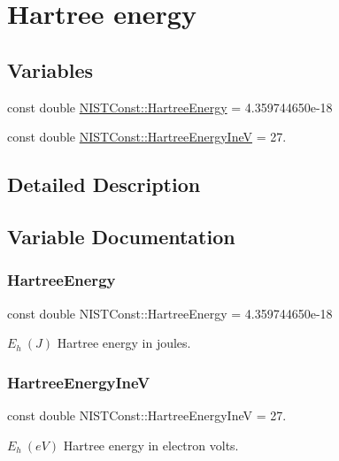 \hypertarget{group___n_i_s_t_const-_hartree_energy}{}\section{Hartree energy}
\label{group___n_i_s_t_const-_hartree_energy}
\subsection*{Variables}
\begin{DoxyCompactItemize}
\item 
const double \mbox{\hyperlink{group___n_i_s_t_const-_hartree_energy_gab58dc1c4e59e83d4fb1217778fe9f29b}{N\+I\+S\+T\+Const\+::\+Hartree\+Energy}} = 4.\+359744650e-\/18
\item 
const double \mbox{\hyperlink{group___n_i_s_t_const-_hartree_energy_ga400eb5b8c9b55b0f601870ba54120364}{N\+I\+S\+T\+Const\+::\+Hartree\+Energy\+IneV}} = 27.
\end{DoxyCompactItemize}


\subsection{Detailed Description}


\subsection{Variable Documentation}
\mbox{\label{group___n_i_s_t_const-_hartree_energy_gab58dc1c4e59e83d4fb1217778fe9f29b}} 
\subsubsection{\texorpdfstring{Hartree\+Energy}{HartreeEnergy}}
{\footnotesize\ttfamily const double N\+I\+S\+T\+Const\+::\+Hartree\+Energy = 4.\+359744650e-\/18}

$E_h \ (J)$ Hartree energy in joules. \mbox{\label{group___n_i_s_t_const-_hartree_energy_ga400eb5b8c9b55b0f601870ba54120364}} 
\subsubsection{\texorpdfstring{Hartree\+Energy\+IneV}{HartreeEnergyIneV}}
{\footnotesize\ttfamily const double N\+I\+S\+T\+Const\+::\+Hartree\+Energy\+IneV = 27.}

$E_h \ (eV)$ Hartree energy in electron volts. 